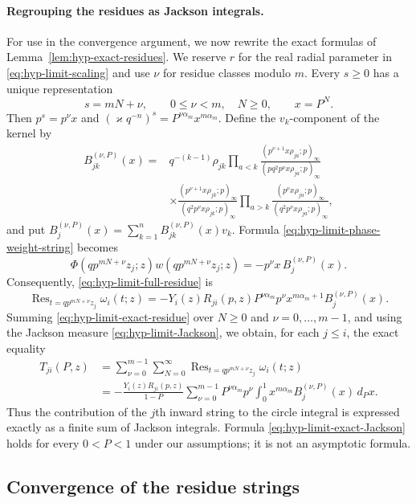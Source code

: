 \documentclass[12pt]{amsart}
\theoremstyle{definition}
\numberwithin{equation}{section}
\theoremstyle{definition}
\let\om\omega
\let\ge\geqslant
\let\le\leqslant
\let\on\operatorname
\def\Res{\on{Res}}
\def\beq{\begin{equation}}
\def\eeq{\end{equation}}
\begin{document}
\paragraph{Regrouping the residues as Jackson integrals.}
For use in the convergence argument, we now rewrite the
exact formulas of Lemma~\ref{lem:hyp-exact-residues}.
We reserve $r$ for the real radial parameter in
\eqref{eq:hyp-limit-scaling} and use $\nu$ for residue classes
modulo $m$. Every $s\ge0$ has a unique representation
\beq\label{eq:hyp-limit-index-decomp}
 s=mN+\nu,\qquad 0\le \nu<m,\quad N\ge0,
 \qquad x=P^N.
\eeq
Then $p^s=p^{\nu}x$ and
$(\varkappa q^{-n})^s=P^{\nu\alpha_m}x^{m\alpha_m}$.
Define the $v_k$-component of the kernel by
\beq\label{eq:hyp-limit-kernel}
 \begin{aligned}
 B_{jk}^{(\nu,P)}(x)
 ={}&q^{-(k-1)}\rho_{jk}
 \prod_{a<k}
 \frac{(p^{\nu+1}x\rho_{ja};p)_\infty}
      {(pq^2p^{\nu}x\rho_{ja};p)_\infty}\\[-1pt]
 &\times
 \frac{(p^{\nu+1}x\rho_{jk};p)_\infty}
      {(q^2p^{\nu}x\rho_{jk};p)_\infty}
 \prod_{a>k}
 \frac{(p^{\nu}x\rho_{ja};p)_\infty}
      {(q^2p^{\nu}x\rho_{ja};p)_\infty},
 \end{aligned}
\eeq
and put $B_j^{(\nu,P)}(x)=\sum_{k=1}^n
B_{jk}^{(\nu,P)}(x)v_k$. Formula
\eqref{eq:hyp-limit-phase-weight-string} becomes
\beq\label{eq:hyp-limit-value}
 \Phi(qp^{mN+\nu}z_j;z)w(qp^{mN+\nu}z_j;z)
 =-p^{\nu}x\,B_j^{(\nu,P)}(x).
\eeq
Consequently, \eqref{eq:hyp-limit-full-residue} is
\beq\label{eq:hyp-limit-exact-residue}
 \Res_{t=qp^{mN+\nu}z_j}\om_i(t;z)
 =-Y_i(z)R_{ji}(p,z)P^{\nu\alpha_m}p^\nu
 x^{m\alpha_m+1}B_j^{(\nu,P)}(x).
\eeq
Summing \eqref{eq:hyp-limit-exact-residue} over $N\ge0$
and $\nu=0,\ldots,m-1$, and using the Jackson measure
\eqref{eq:hyp-limit-Jackson}, we obtain, for each $j\le i$,
the exact equality
\beq\label{eq:hyp-limit-exact-Jackson}
 \begin{aligned}
 T_{ji}(P,z)
 &=\sum_{\nu=0}^{m-1}\sum_{N=0}^{\infty}
   \Res_{t=qp^{mN+\nu}z_j}\om_i(t;z)\\
 &=-\frac{Y_i(z)R_{ji}(p,z)}{1-P}
 \sum_{\nu=0}^{m-1}P^{\nu\alpha_m}p^\nu
 \int_0^1x^{m\alpha_m}B_j^{(\nu,P)}(x)\,d_Px.
 \end{aligned}
\eeq
Thus the contribution of the $j$th inward string to the
circle integral is expressed exactly as a finite sum of
Jackson integrals. Formula \eqref{eq:hyp-limit-exact-Jackson}
holds for every $0<P<1$ under our assumptions; it is not
an asymptotic formula.

\subsection{Convergence of the residue strings}
\label{subsec:hyp-limit-convergence}
\end{document}
